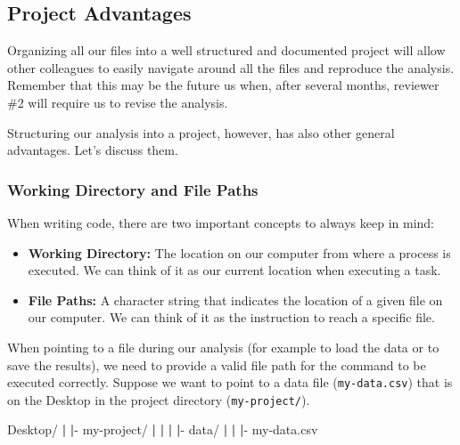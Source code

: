 \documentclass[
  11pt,
]{book}
\newenvironment{Shaded}{\begin{snugshade}}{\end{snugshade}}
\newcommand{\ExtensionTok}[1]{#1}
\newcommand{\KeywordTok}[1]{\textcolor[rgb]{0.13,0.29,0.53}{\textbf{#1}}}
\newcommand{\NormalTok}[1]{#1}
\providecommand{\tightlist}{%
  \setlength{\itemsep}{0pt}\setlength{\parskip}{0pt}}
\begin{document}
\hypertarget{project-advantages}{%
\subsection{Project Advantages}\label{project-advantages}}

Organizing all our files into a well structured and documented project will allow other colleagues to easily navigate around all the files and reproduce the analysis. Remember that this may be the future us when, after several months, reviewer \#2 will require us to revise the analysis.

Structuring our analysis into a project, however, has also other general advantages. Let's discuss them.

\hypertarget{wd-file-path}{%
\subsubsection{Working Directory and File Paths}\label{wd-file-path}}

When writing code, there are two important concepts to always keep in mind:

\begin{itemize}
\tightlist
\item
  \textbf{Working Directory:} The location on our computer from where a process is executed. We can think of it as our current location when executing a task.
\item
  \textbf{File Paths:} A character string that indicates the location of a given file on our computer. We can think of it as the instruction to reach a specific file.
\end{itemize}

When pointing to a file during our analysis (for example to load the data or to save the results), we need to provide a valid file path for the command to be executed correctly. Suppose we want to point to a data file (\texttt{my-data.csv}) that is on the Desktop in the project directory (\texttt{my-project/}).

\begin{Shaded}
\begin{Highlighting}[]
\ExtensionTok{Desktop/}
 \KeywordTok{|}
 \KeywordTok{|}\ExtensionTok{{-}}\NormalTok{  my{-}project/}
 \KeywordTok{|}    \KeywordTok{|}
 \KeywordTok{|}    \KeywordTok{|}\ExtensionTok{{-}}\NormalTok{ data/}
 \KeywordTok{|}    \KeywordTok{|}   \KeywordTok{|}\ExtensionTok{{-}}\NormalTok{ my{-}data.csv}
\end{Highlighting}
\end{Shaded}
\end{document}
